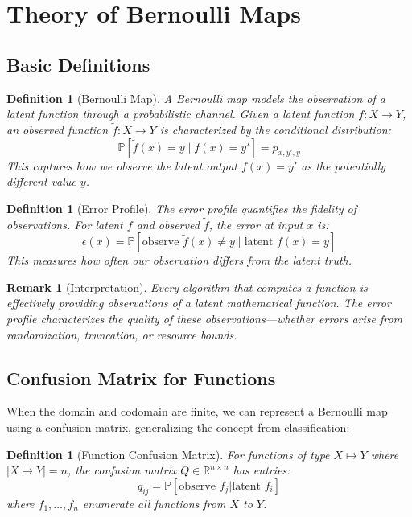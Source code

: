 \documentclass[11pt,final,hidelinks]{article}
\newtheorem{definition}[theorem]{Definition}
\newtheorem{remark}[theorem]{Remark}
\newcommand{\obs}[1]{\widetilde{#1}}  %
\newcommand{\Prob}[1]{\mathbb{P}\left[#1\right]}
\newcommand{\ProbCond}[2]{\mathbb{P}\left[#1 \mid #2\right]}
\newcommand{\error}{\epsilon}
\begin{document}
\section{Theory of Bernoulli Maps}

\subsection{Basic Definitions}

\begin{definition}[Bernoulli Map]
A Bernoulli map models the observation of a latent function through a probabilistic channel. Given a latent function $f : X \to Y$, an observed function $\obs{f} : X \to Y$ is characterized by the conditional distribution:
\begin{equation}
\ProbCond{\obs{f}(x) = y}{f(x) = y'} = p_{x,y',y}
\end{equation}
This captures how we observe the latent output $f(x) = y'$ as the potentially different value $y$.
\end{definition}

\begin{definition}[Error Profile]
The error profile quantifies the fidelity of observations. For latent $f$ and observed $\obs{f}$, the error at input $x$ is:
\begin{equation}
\error(x) = \Prob{\text{observe } \obs{f}(x) \neq y \mid \text{latent } f(x) = y}
\end{equation}
This measures how often our observation differs from the latent truth.
\end{definition}

\begin{remark}[Interpretation]
Every algorithm that computes a function is effectively providing observations of a latent mathematical function. The error profile characterizes the quality of these observations—whether errors arise from randomization, truncation, or resource bounds.
\end{remark}

\subsection{Confusion Matrix for Functions}

When the domain and codomain are finite, we can represent a Bernoulli map using a confusion matrix, generalizing the concept from classification:

\begin{definition}[Function Confusion Matrix]
For functions of type $X \mapsto Y$ where $|X \mapsto Y| = n$, the confusion matrix $Q \in \mathbb{R}^{n \times n}$ has entries:
\begin{equation}
q_{ij} = \Prob{\text{observe } f_j | \text{latent } f_i}
\end{equation}
where $f_1, \ldots, f_n$ enumerate all functions from $X$ to $Y$.
\end{definition}
\end{document}
